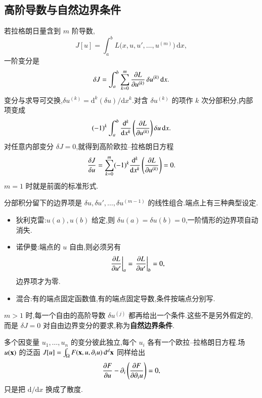 \subsection{高阶导数与自然边界条件}
若拉格朗日量含到 $m$ 阶导数,
\begin{equation}
  J[u] = \int_a^b L\bigl(x,u,u',\ldots,u^{(m)}\bigr)\,\mathrm{d}x,
\end{equation}
一阶变分是
\begin{equation}
  \delta J = \int_a^b \sum_{k=0}^{m} \frac{\partial{L}}{\partial{u^{(k)}}}\,\delta u^{(k)}\,\mathrm{d}x.
\end{equation}
变分与求导可交换,$\delta u^{(k)}=\mathrm{d}^k(\delta u)/\mathrm{d}x^k$.对含 $\delta u^{(k)}$ 的项作 $k$ 次分部积分,内部项变成
\begin{equation}
  (-1)^k \int_a^b \frac{\mathrm{d}^k}{\mathrm{d}x^k}\left(\frac{\partial{L}}{\partial{u^{(k)}}}\right)\delta u\,\mathrm{d}x.
\end{equation}
对任意内部变分 $\delta J=0$,就得到高阶欧拉--拉格朗日方程
\begin{equation}
  \frac{\delta {J}}{\delta {u}}
  = \sum_{k=0}^{m}(-1)^k \frac{\mathrm{d}^k}{\mathrm{d}x^k}\left(\frac{\partial{L}}{\partial{u^{(k)}}}\right)
  = 0.
\end{equation}
$m=1$ 时就是前面的标准形式.

分部积分留下的边界项是 $\delta u,\delta u',\ldots,\delta u^{(m-1)}$ 的线性组合.端点上有三种典型设定.
\begin{itemize}
  \item 狄利克雷:$u(a),u(b)$ 给定,则 $\delta u(a)=\delta u(b)=0$,一阶情形的边界项自动消失.
  \item 诺伊曼:端点的 $u$ 自由,则必须另有
  \begin{equation}
    \left.\frac{\partial{L}}{\partial{u'}}\right|_{a}
    = \left.\frac{\partial{L}}{\partial{u'}}\right|_{b} = 0,
  \end{equation}
  边界项才为零.
  \item 混合:有的端点固定函数值,有的端点固定导数,条件按端点分别写.
\end{itemize}
$m>1$ 时,每一个自由的高阶导数 $\delta u^{(j)}$ 都再给出一个条件.这些不是另外假定的,而是 $\delta J=0$ 对自由边界变分的要求,称为\textbf{自然边界条件}.

多个因变量 $u_1,\ldots,u_n$ 的变分彼此独立,每个 $u_i$ 各有一个欧拉--拉格朗日方程.场 $u({\mathbf{x}})$ 的泛函 $J[u]=\int_{\Omega} F({\mathbf{x}},u,\partial_i u)\,\mathrm{d}^d{\mathbf{x}}$ 同样给出
\begin{equation}
  \frac{\partial{F}}{\partial{u}} - \partial_i\left(\frac{\partial{F}}{\partial{\partial_i u}}\right) = 0,
\end{equation}
只是把 $\mathrm{d}/\mathrm{d}x$ 换成了散度.

